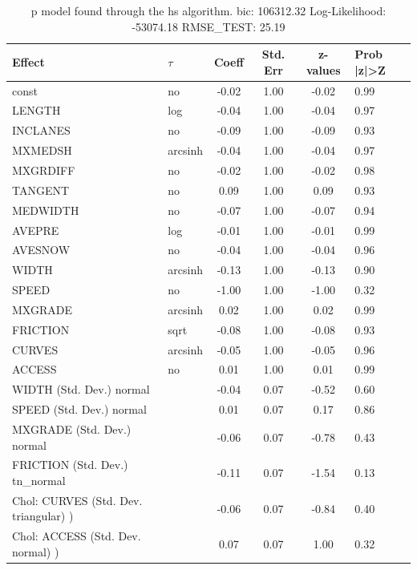 \begin{table}
	\caption{p model found through the hs algorithm. bic: 106312.32 Log-Likelihood: -53074.18 RMSE_TEST: 25.19}
	\begin{center}
		\begin{tabular}{|l|l|c|c|c|l|}
			\hline
			Effect & $\tau$ & Coeff & Std. Err & z-values & Prob |z|>Z \\
			\hline
			const & no & -0.02 & 1.00 & -0.02 & 0.99 \\
			\hline
			LENGTH & log & -0.04 & 1.00 & -0.04 & 0.97 \\
			\hline
			INCLANES & no & -0.09 & 1.00 & -0.09 & 0.93 \\
			\hline
			MXMEDSH & arcsinh & -0.04 & 1.00 & -0.04 & 0.97 \\
			\hline
			MXGRDIFF & no & -0.02 & 1.00 & -0.02 & 0.98 \\
			\hline
			TANGENT & no & 0.09 & 1.00 & 0.09 & 0.93 \\
			\hline
			MEDWIDTH & no & -0.07 & 1.00 & -0.07 & 0.94 \\
			\hline
			AVEPRE & log & -0.01 & 1.00 & -0.01 & 0.99 \\
			\hline
			AVESNOW & no & -0.04 & 1.00 & -0.04 & 0.96 \\
			\hline
			WIDTH & arcsinh & -0.13 & 1.00 & -0.13 & 0.90 \\
			\hline
			SPEED & no & -1.00 & 1.00 & -1.00 & 0.32 \\
			\hline
			MXGRADE & arcsinh & 0.02 & 1.00 & 0.02 & 0.99 \\
			\hline
			FRICTION & sqrt & -0.08 & 1.00 & -0.08 & 0.93 \\
			\hline
			CURVES & arcsinh & -0.05 & 1.00 & -0.05 & 0.96 \\
			\hline
			ACCESS & no & 0.01 & 1.00 & 0.01 & 0.99 \\
			\hline
			WIDTH (Std. Dev.) normal &  & -0.04 & 0.07 & -0.52 & 0.60 \\
			\hline
			SPEED (Std. Dev.) normal &  & 0.01 & 0.07 & 0.17 & 0.86 \\
			\hline
			MXGRADE (Std. Dev.) normal &  & -0.06 & 0.07 & -0.78 & 0.43 \\
			\hline
			FRICTION (Std. Dev.) tn_normal &  & -0.11 & 0.07 & -1.54 & 0.13 \\
			\hline
			 Chol: CURVES (Std. Dev. triangular) ) &  & -0.06 & 0.07 & -0.84 & 0.40 \\
			\hline
			 Chol: ACCESS (Std. Dev. normal) ) &  & 0.07 & 0.07 & 1.00 & 0.32 \\

\end{tabular}
\end{center}
\end{table}

